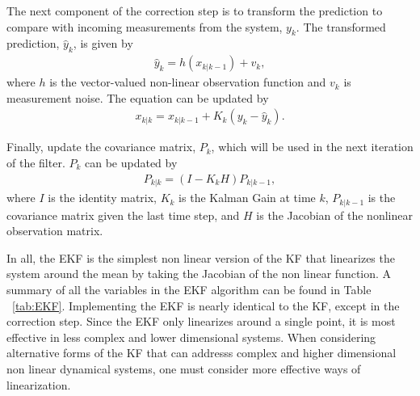 \begin{enumerate}
    \noindent  The next component of the correction step is to transform the prediction to compare with incoming measurements from the system, $y_k$. The transformed prediction, $\hat y_k$, is given by
    \begin{align*}
        \hat y_k = h( x_{k|k-1} ) + v_k,
    \end{align*}
   where $h$ is the vector-valued non-linear observation function and $v_k$ is measurement noise. The equation can be updated by 
     \begin{align*} 
        x_{k|k} = x_{k |k-1} + K_k(y_{k} - \hat y_{k}).
    \end{align*}
    
    \noindent Finally, update the covariance matrix, $P_k $, which will be used in the next iteration of the filter. $P_k $ can be updated by
    \begin{align*} 
        P_{k|k} = (I - K_k H) P_{k | k-1},
    \end{align*}
    where $I$ is the identity matrix, $K_k$ is the Kalman Gain at time $k$, $P_{k | k-1}$ is the covariance matrix given the last time step, and $H$ is the Jacobian of the nonlinear observation matrix. \\
\end{enumerate} 




\noindent In all, the EKF is the simplest non linear version of the KF that linearizes the system around the mean by taking the Jacobian of the non linear function. A summary of all the variables in the EKF algorithm can be found in Table ~\ref{tab:EKF}. Implementing the EKF is nearly identical to the KF, except in the correction step. Since the EKF only linearizes around a single point, it is most effective in less complex and lower dimensional systems. When considering alternative forms of the KF that can addresss complex and higher dimensional non linear dynamical systems, one must consider more effective ways of linearization.



